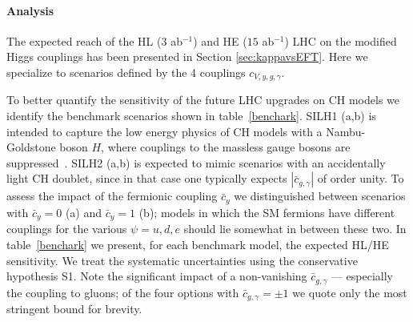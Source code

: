 \paragraph{Analysis}

The expected reach of the HL ($3$ ab$^{-1}$) and HE ($15$ ab$^{-1}$) LHC on the modified Higgs couplings has been presented in Section \ref{sec:kappavsEFT}. Here we specialize to scenarios defined by the 4 couplings $c_{V,y,g,\gamma}$. 

To better quantify the sensitivity of the future LHC upgrades on CH models we identify the benchmark scenarios shown in table~\ref{benchark}. SILH1 (a,b) is intended to capture the low energy physics of CH models with a Nambu-Goldstone boson $H$, where couplings to the massless gauge bosons are suppressed~\cite{Giudice:2007fh}. SILH2 (a,b) is expected to mimic scenarios with an accidentally light CH doublet, since in that case one typically expects $|\bar c_{g,\gamma}|$ of order unity. To assess the impact of the fermionic coupling $\bar c_y$ we distinguished between scenarios with $\bar c_y=0$ (a) and $\bar c_y=1$ (b); models in which the SM fermions have different couplings for the various $\psi=u,d,e$ should lie somewhat in between these two. In table~\ref{benchark} we present, for each benchmark model, the expected HL/HE sensitivity. We treat the systematic uncertainties using the conservative hypothesis S1. Note the significant impact of a non-vanishing $\bar c_{g,\gamma}$ --- especially the coupling to gluons; of the four options with $\bar c_{g,\gamma}=\pm1$ we quote only the most stringent bound for brevity. 




